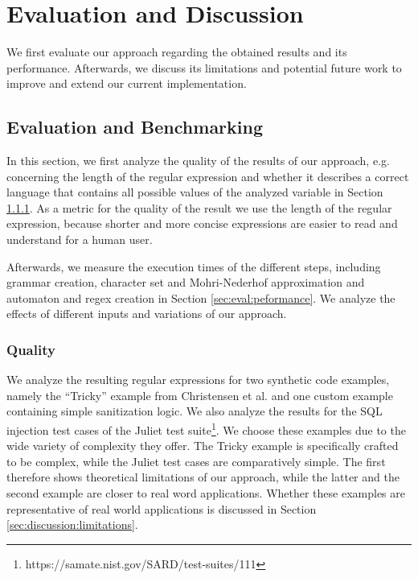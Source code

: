 \chapter{Evaluation and Discussion}
\label{chapter:Evaluation}

We first evaluate our approach regarding the obtained results and its performance. Afterwards, we discuss its limitations and potential future work to improve and extend our current implementation.

\section{Evaluation and Benchmarking}

In this section, we first analyze the quality of the results of our approach, e.g. concerning the length of the regular expression and whether it describes a correct language that contains all possible values of the analyzed variable in Section \ref{sec:eval:quality}. As a metric for the quality of the result we use the length of the regular expression, because shorter and more concise expressions are easier to read and understand for a human user.

Afterwards, we measure the execution times of the different steps, including grammar creation, character set and Mohri-Nederhof approximation and automaton and regex creation in Section \ref{sec:eval:peformance}. We analyze the effects of different inputs and variations of our approach.

\subsection{Quality}\label{sec:eval:quality}

We analyze the resulting regular expressions for two synthetic code examples, namely the \enquote{Tricky} example from Christensen et al. \cite{brics} and one custom example containing simple sanitization logic. We also analyze the results for the SQL injection test cases of the Juliet test suite\footnote{https://samate.nist.gov/SARD/test-suites/111}. We choose these examples due to the wide variety of complexity they offer. The Tricky example is specifically crafted to be complex, while the Juliet test cases are comparatively simple. The first therefore shows theoretical limitations of our approach, while the latter and the second example are closer to real word applications. Whether these examples are representative of real world applications is discussed in Section \ref{sec:discussion:limitations}.

